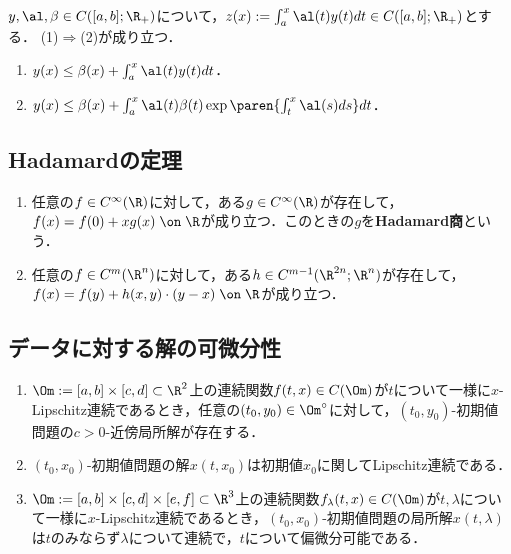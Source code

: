 \documentclass[uplatex,dvipdfmx]{jsreport}
\begin{document}
\begin{lemma}
    $y,\al,\beta\in C([a,b];\R_+)$について，$z(x):=\int^x_a\al(t)y(t)dt\in C([a,b];\R_+)$とする．
    (1)$\Rightarrow$(2)が成り立つ．
    \begin{enumerate}
        \item $y(x)\le\beta(x)+\int^x_a\al(t)y(t)dt$．
        \item $y(x)\le\beta(x)+\int^x_a\al(t)\beta(t)\exp\paren{\int^x_t\al(s)ds}dt$．
    \end{enumerate}
\end{lemma}

\subsection{Hadamardの定理}

\begin{lemma}\mbox{}
    \begin{enumerate}
        \item 任意の$f\in C^\infty(\R)$に対して，ある$g\in C^\infty(\R)$が存在して，$f(x)=f(0)+xg(x)\;\on\;\R$が成り立つ．このときの$g$を\textbf{Hadamard商}という．
        \item 任意の$f\in C^m(\R^n)$に対して，ある$h\in C^{m-1}(\R^{2n};\R^n)$が存在して，$f(x)=f(y)+h(x,y)\cdot(y-x)\;\on\;\R$が成り立つ．
    \end{enumerate}
\end{lemma}

\subsection{データに対する解の可微分性}

\begin{theorem}\mbox{}
    \begin{enumerate}
        \item $\Om:=[a,b]\times[c,d]\subset\R^2$上の連続関数$f(t,x)\in C(\Om)$が$t$について一様に$x$-Lipschitz連続であるとき，任意の$(t_0,y_0)\in\Om^\circ$に対して，$(t_0,y_0)$-初期値問題の$c>0$-近傍局所解が存在する．
        \item $(t_0,x_0)$-初期値問題の解$x(t,x_0)$は初期値$x_0$に関してLipschitz連続である．
        \item $\Om:=[a,b]\times[c,d]\times[e,f]\subset\R^3$上の連続関数$f_\lambda(t,x)\in C(\Om)$が$t,\lambda$について一様に$x$-Lipschitz連続であるとき，$(t_0,x_0)$-初期値問題の局所解$x(t,\lambda)$は$t$のみならず$\lambda$について連続で，$t$について偏微分可能である．
    \end{enumerate}
\end{theorem}
\end{document}
